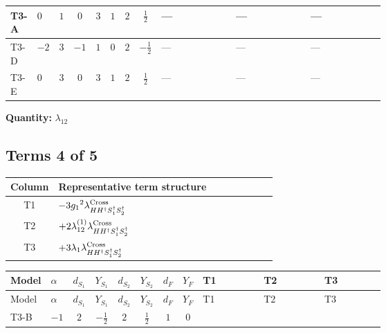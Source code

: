 \documentclass[8pt]{article}
\begin{document}
\begin{landscape}
\begin{longtable}{@{}llcccccc >{\raggedright\arraybackslash}p{0.21\linewidth} >{\raggedright\arraybackslash}p{0.21\linewidth} >{\raggedright\arraybackslash}p{0.21\linewidth}@{}}
\midrule
T3-A & $0$ & $1$ & $0$ & $3$ & $1$ & $2$ & $\frac{1}{2}$ & --- & --- & --- \\
\midrule
T3-D & $-2$ & $3$ & $-1$ & $1$ & $0$ & $2$ & $-\frac{1}{2}$ & --- & --- & --- \\
\midrule
T3-E & $0$ & $3$ & $0$ & $3$ & $1$ & $2$ & $\frac{1}{2}$ & --- & --- & --- \\
\midrule
\bottomrule
\end{longtable}
\clearpage
\noindent\textbf{Quantity: }$\lambda_{12}$\par\smallskip
\subsection*{Terms 4 of 5}
\begin{center}
\begin{tabular}{@{}c >{\raggedright\arraybackslash}p{0.82\linewidth}@{}}
\toprule
Column & Representative term structure \\
\midrule
T1 & \(\displaystyle -3 {g_1}^2 {\lambda_{H H^\dagger S_1^\dagger S_2^\dagger}^{\rm Cross}}\) \\
\midrule
T2 & \(\displaystyle +2 {\lambda_{12}^{(1)}} {\lambda_{H H^\dagger S_1^\dagger S_2^\dagger}^{\rm Cross}}\) \\
\midrule
T3 & \(\displaystyle +3 {\lambda_1} {\lambda_{H H^\dagger S_1^\dagger S_2^\dagger}^{\rm Cross}}\) \\
\midrule
\bottomrule
\end{tabular}
\end{center}
\smallskip
\tiny
\begin{longtable}{@{}llcccccc >{\raggedright\arraybackslash}p{0.21\linewidth} >{\raggedright\arraybackslash}p{0.21\linewidth} >{\raggedright\arraybackslash}p{0.21\linewidth}@{}}
\toprule
Model & $\alpha$ & $d_{S_1}$ & $Y_{S_1}$ & $d_{S_2}$ & $Y_{S_2}$ & $d_F$ & $Y_F$ & T1 & T2 & T3 \\
\midrule
\endfirsthead
\toprule
Model & $\alpha$ & $d_{S_1}$ & $Y_{S_1}$ & $d_{S_2}$ & $Y_{S_2}$ & $d_F$ & $Y_F$ & T1 & T2 & T3 \\
\midrule
\endhead
T3-B & $-1$ & $2$ & $-\frac{1}{2}$ & $2$ & $\frac{1}{2}$ & $1$ & $0$ & \scriptsize\adjustbox{max width=\linewidth}{$\begin{gathered} -3 {g_1}^2 {\lambda_{H H^\dagger S_1^\dagger S_2^\dagger}^{\rm Cross}}\end{gathered}$} & \scriptsize\adjustbox{max width=\linewidth}{$\begin{gathered} +2 {\lambda_{12}^{(1)}} {\lambda_{H H^\dagger S_1^\dagger S_2^\dagger}^{\rm Cross}}\end{gathered}$} & \scriptsize\adjustbox{max width=\linewidth}{$\begin{gathered} +3 {\lambda_1} {\lambda_{H H^\dagger S_1^\dagger S_2^\dagger}^{\rm Cross}}\end{gathered}$} \\

\end{longtable}
\end{landscape}
\end{document}
